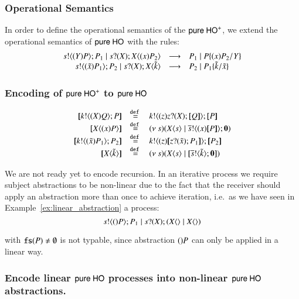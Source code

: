 \subsubsection{Operational Semantics}
In order to define the operational semantics of the $\mathsf{pure\ HO}^+$,
we extend the operational semantics of $\mathsf{pure\ HO}$ with the rules:
%
\[
	\begin{array}{rcl}
		s ! \langle (Y)P \rangle ; P_1 \;|\; s ? (X) ; X\langle (x)P_2 \rangle &\longrightarrow& P_1 \;|\; P \{(x)P_2/Y \}\\
		s ! \langle (\tilde{x})P_1 \rangle ; P_2 \;|\; s ? (X) ; X\langle \tilde{k} \rangle &\longrightarrow& P_2 \;|\; P_1\{\tilde{k}/\tilde{x} \}
	\end{array}
\]
%
\subsubsection{Encoding of $\mathsf{pure\ HO}^+$ to $\mathsf{pure\ HO}$}
%
\[
	\begin{array}{rcl}
		\map{\bout{k}{\abs{\X} Q} P}	&\defeq&	\bout{k}{\abs{z} \binp{z}{\X} \map{Q}} \map{P}\\
		\map{\appl{X}{\abs{x} P}}	&\defeq&	\newsp{s}{\appl{X}{s} \Par \bout{\dual{s}}{\abs{x}{\map{P}}} \inact}\\

		\map{\bout{k}{\abs{\tilde{x}}{P_1}} P_2}	&\defeq&	\bout{k}{ \abs{z}{ \map{ \binp{z}{\tilde{x}} P_1} } } \map{P_2}\\
		\map{\appl{\X}{\tilde{k}}}			&\defeq&	\newsp{s}{\appl{\X}{s} \Par \map{\bout{\dual{s}}{\tilde{k}} \inact}}\\
	\end{array}
\]

We are not ready yet to encode recursion. In an iterative process we require
subject abstractions to be non-linear due to the fact that the receiver should
apply an abstraction more than once to achieve iteration,
i.e.~as we have seen in Example~\ref{ex:linear_abstraction} a process:
\[
	s ! \langle ()P \rangle ; P_1 \;|\; s ? (X) ; (X\langle  \rangle \;|\; X\langle  \rangle)
\]

with $\mathtt{fs}(P) \not= \emptyset$ is not typable, since abstraction $()P$
can only be applied in a linear way.


\subsubsection{Encode linear $\mathsf{pure\ HO}$ processes into non-linear $\mathsf{pure\ HO}$ abstractions.}

